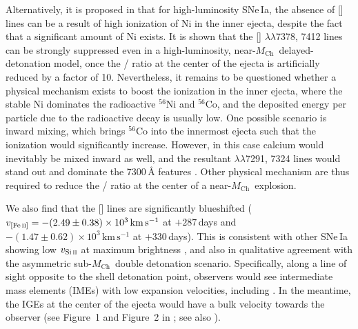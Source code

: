 \documentclass[twocolumn]{aastex631}
\newcommand{\Mch}{$M_\mathrm{Ch}$}
\begin{document}
\begin{CJK*}{UTF8}{gbsn}
Alternatively, it is proposed in \citet{Blondin_2022} that for high-luminosity SNe\,Ia, the absence of [] lines can be a result of high ionization of Ni in the inner ejecta, despite the fact that a significant amount of Ni exists. It is shown that the [] $\lambda\lambda$7378, 7412 lines can be strongly suppressed even in a high-luminosity, near-\Mch\ delayed-detonation model, once the / ratio at the center of the ejecta is artificially reduced by a factor of 10. Nevertheless, it remains to be questioned whether a physical mechanism exists to boost the ionization in the inner ejecta, where the stable Ni dominates the radioactive $^{56}$Ni and $^{56}$Co, and the deposited energy per particle due to the radioactive decay is usually low. One possible scenario is inward mixing, which brings $^{56}$Co into the innermost ejecta such that the ionization would significantly increase. However, in this case calcium would inevitably be mixed inward as well, and the resultant  $\lambda\lambda$7291, 7324 lines would stand out and dominate the 7300\,\r{A} features \citep{Blondin_2022}. Other physical mechanism are thus required to reduce the / ratio at the center of a near-\Mch\ explosion.

We also find that the [] lines are significantly blueshifted ($v_\mathrm{[Fe\,\textsc{ii}]}=-(2.49\pm0.38)\times10^3\mathrm{\,km\,s^{-1}}$ at $+287$\,days and $-(1.47\pm0.62)\times10^3\mathrm{\,km\,s^{-1}}$ at $+330$\,days). This is consistent with other SNe\,Ia showing low $v_\mathrm{Si\,\textsc{ii}}$ at maximum brightness \citep{Maeda_2010,Maguire_2018,Li_2021}, and also in qualitative agreement with the asymmetric sub-\Mch\ double detonation scenario. Specifically, along a line of sight opposite to the shell detonation point, observers would see intermediate mass elements (IMEs) with low expansion velocities, including . In the meantime, the IGEs at the center of the ejecta would have a bulk velocity towards the observer (see Figure~1 and Figure~2 in \citealp{Bulla_2016}; see also \citealp{Fink_DD_2010}).




\end{CJK*}
\end{document}
